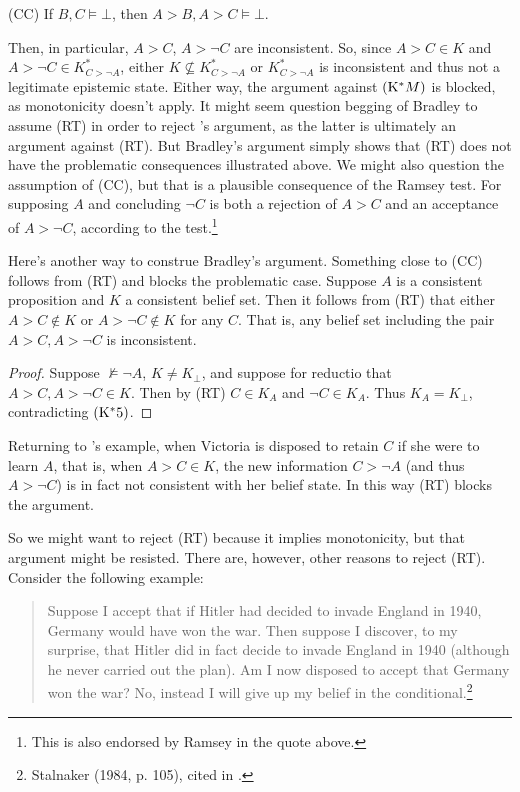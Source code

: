 \documentclass[12pt]{article}
\begin{document}
(CC) If $B,C \vDash \bot$, then $A > B, A > C \vDash \bot$.

Then, in particular, $A>C$, $A>\neg C$ are inconsistent. So, since $A>C \in K$ and $A>\neg C \in K_{C > \neg A}^*$, either $K \not\subseteq K_{C > \neg A}^*$ or $K_{C > \neg A}^*$ is inconsistent and thus not a legitimate epistemic state. Either way, the argument against $\pst{*M}$ is blocked, as monotonicity doesn't apply. It might seem question begging of Bradley to assume (RT) in order to reject \gf's argument, as the latter is ultimately an argument against (RT). But Bradley's argument simply shows that (RT) does not have the problematic consequences illustrated above. We might also question the assumption of (CC), but that is a plausible consequence of the Ramsey test. For supposing $A$ and concluding $\neg C$ is both a rejection of $A>C$ and an acceptance of $A>\neg C$, according to the test.\footnote{This is also endorsed by Ramsey in the quote above.}

Here's another way to construe Bradley's argument. Something close to (CC) follows from (RT) and blocks the problematic case. Suppose $A$ is a consistent proposition and $K$ a consistent belief set. Then it follows from (RT) that either $A>C\not\in K$ or $A>\neg C\not\in K$ for any $C$. That is, any belief set including the pair $A>C,A>\neg C$ is inconsistent.

\begin{proof}
Suppose $\not\vDash \neg A$, $K\neq K_\bot$, and suppose for reductio that $A>C,A>\neg C\in K$. Then by (RT) $C \in K_A$ and $\neg C \in K_A$. Thus $K_A = K_\bot$, contradicting $\pst{*5}$.
\end{proof}

Returning to \gf's example, when Victoria is disposed to retain $C$ if she were to learn $A$, that is, when $A>C \in K$, the new information $C>\neg A$ (and thus $A>\neg C$) is in fact not consistent with her belief state. In this way (RT) blocks the argument.

So we might want to reject (RT) because it implies monotonicity, but that argument might be resisted. There are, however, other reasons to reject (RT). Consider the following example:

\begin{quote}
Suppose I accept that if Hitler had decided to invade England in 1940, Germany would have won the war. Then suppose I discover, to my surprise, that Hitler did in fact decide to invade England in 1940 (although he never carried out the plan). Am I now disposed to accept that Germany won the war? No, instead I will give up my belief in the conditional.\footnote{Stalnaker (1984, p. 105), cited in .}
\end{quote}
\end{document}
